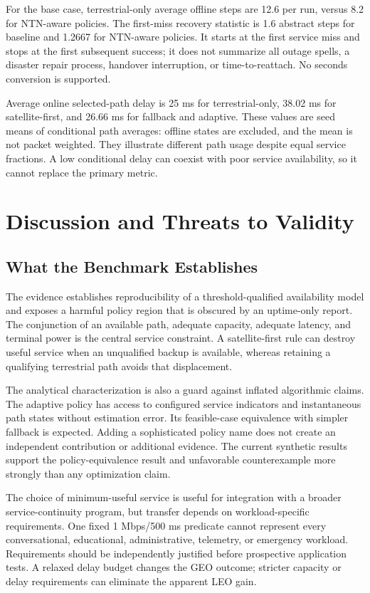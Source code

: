 \documentclass[10pt,twocolumn]{article}
\begin{document}

For the base case, terrestrial-only average offline steps are 12.6 per run, versus 8.2 for NTN-aware policies. The first-miss recovery statistic is 1.6 abstract steps for baseline and 1.2667 for NTN-aware policies. It starts at the first service miss and stops at the first subsequent success; it does not summarize all outage spells, a disaster repair process, handover interruption, or time-to-reattach. No seconds conversion is supported.

Average online selected-path delay is 25 ms for terrestrial-only, 38.02 ms for satellite-first, and 26.66 ms for fallback and adaptive. These values are seed means of conditional path averages: offline states are excluded, and the mean is not packet weighted. They illustrate different path usage despite equal service fractions. A low conditional delay can coexist with poor service availability, so it cannot replace the primary metric.

\section{Discussion and Threats to Validity}
\subsection{What the Benchmark Establishes}
The evidence establishes reproducibility of a threshold-qualified availability model and exposes a harmful policy region that is obscured by an uptime-only report. The conjunction of an available path, adequate capacity, adequate latency, and terminal power is the central service constraint. A satellite-first rule can destroy useful service when an unqualified backup is available, whereas retaining a qualifying terrestrial path avoids that displacement.

The analytical characterization is also a guard against inflated algorithmic claims. The adaptive policy has access to configured service indicators and instantaneous path states without estimation error. Its feasible-case equivalence with simpler fallback is expected. Adding a sophisticated policy name does not create an independent contribution or additional evidence. The current synthetic results support the policy-equivalence result and unfavorable counterexample more strongly than any optimization claim.

The choice of minimum-useful service is useful for integration with a broader service-continuity program, but transfer depends on workload-specific requirements. One fixed 1 Mbps/500 ms predicate cannot represent every conversational, educational, administrative, telemetry, or emergency workload. Requirements should be independently justified before prospective application tests. A relaxed delay budget changes the GEO outcome; stricter capacity or delay requirements can eliminate the apparent LEO gain.
\end{document}
